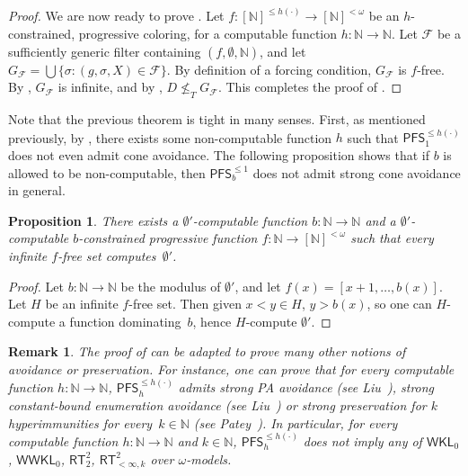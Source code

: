 \documentclass{article}
\def\F{\mathcal{F}}
\newcommand{\WKL}[0]{\mathsf{WKL}}
\newcommand{\WWKL}[0]{\mathsf{WWKL}}
\newcommand{\PFS}[0]{\mathsf{PFS}}
\newcommand{\RT}[0]{\mathsf{RT}}
\newcommand{\NN}[0]{\mathbb{N}}
\numberwithin{theorem}{section}
\newtheorem{proposition}[theorem]{Proposition}
\newtheorem{remark}[theorem]{Remark}
\begin{document}
\begin{proof}
We are now ready to prove .
Let $f : [\NN]^{\leq h(\cdot)} \to [\NN]^{<\omega}$ be an $h$-constrained, progressive coloring, for a computable function $h : \NN \to \NN$.
Let $\F$ be a sufficiently generic filter containing $(f, \emptyset, \NN)$,
and let $G_\F = \bigcup \{ \sigma : (g, \sigma, X) \in \F \}$. By definition of a forcing condition, $G_\F$ is $f$-free. By , $G_\F$ is infinite, and by , $D \not \leq_T G_\F$.
This completes the proof of .
\end{proof}

Note that the previous theorem is tight in many senses. First, as mentioned previously, by , there exists some non-computable function $h$ such that $\PFS^{\leq h(\cdot)}_1$ does not even admit cone avoidance. The following proposition shows that if $b$ is allowed to be non-computable, then $\PFS^{\leq 1}_b$ does not admit strong cone avoidance in general.

\begin{proposition}
There exists a $\emptyset'$-computable function $b : \NN \to \NN$ and a $\emptyset'$-computable $b$-constrained progressive function $f : \NN \to [\NN]^{<\omega}$ such that every infinite $f$-free set computes~$\emptyset'$.
\end{proposition}
\begin{proof}
Let $b : \NN \to \NN$ be the modulus of $\emptyset'$,
and let $f(x) = [x+1, \dots, b(x)]$. Let $H$ be an infinite $f$-free set.
Then given $x < y \in H$, $y > b(x)$, so one can $H$-compute a function dominating~$b$, hence $H$-compute $\emptyset'$.
\end{proof}

\begin{remark}
The proof of  can be adapted to prove many other notions of avoidance or preservation. For instance, one can prove that for every computable function $h : \NN \to \NN$, $\PFS^{\leq h(\cdot)}_h$ admits strong PA avoidance (see Liu~\cite{liu2012rt22}), strong constant-bound enumeration avoidance (see Liu~\cite{liu2015cone}) or strong preservation for $k$ hyperimmunities for every~$k \in \NN$ (see Patey~\cite{patey2017iterative}).
In particular, for every computable function $h : \NN \to \NN$ and $k \in \NN$, $\PFS^{\leq h(\cdot)}_h$ does not imply any of $\WKL_0$, $\WWKL_0$, $\RT^2_2$, $\RT^2_{<\infty, k}$ over $\omega$-models.
\end{remark}
\end{document}

